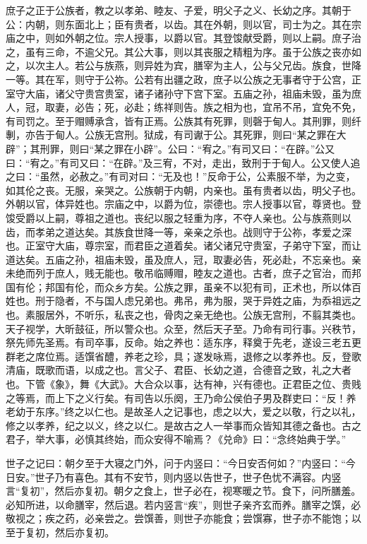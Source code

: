 \documentclass[]{article}
\begin{document}
庶子之正于公族者，教之以孝弟、睦友、子爱，明父子之义、长幼之序。其朝于公：内朝，则东面北上；臣有贵者，以齿。其在外朝，则以官，司士为之。其在宗庙之中，则如外朝之位。宗人授事，以爵以官。其登馂献受爵，则以上嗣。庶子治之，虽有三命，不逾父兄。其公大事，则以其丧服之精粗为序。虽于公族之丧亦如之，以次主人。若公与族燕，则异姓为宾，膳宰为主人，公与父兄齿。族食，世降一等。其在军，则守于公祢。公若有出疆之政，庶子以公族之无事者守于公宫，正室守大庙，诸父守贵宫贵室，诸子诸孙守下宫下室。五庙之孙，祖庙未毁，虽为庶人，冠，取妻，必告；死，必赴；练祥则告。族之相为也，宜吊不吊，宜免不免，有司罚之。至于赗赙承含，皆有正焉。公族其有死罪，则磬于甸人。其刑罪，则纤剸，亦告于甸人。公族无宫刑。狱成，有司谳于公。其死罪，则曰``某之罪在大辟''；其刑罪，则曰``某之罪在小辟''。公曰：``宥之。''有司又曰：``在辟。''公又曰：``宥之。''有司又曰：``在辟。''及三宥，不对，走出，致刑于于甸人。公又使人追之曰：``虽然，必赦之。''有司对曰：``无及也！''反命于公，公素服不举，为之变，如其伦之丧。无服，亲哭之。公族朝于内朝，内亲也。虽有贵者以齿，明父子也。外朝以官，体异姓也。宗庙之中，以爵为位，崇德也。宗人授事以官，尊贤也。登馂受爵以上嗣，尊祖之道也。丧纪以服之轻重为序，不夺人亲也。公与族燕则以齿，而孝弟之道达矣。其族食世降一等，亲亲之杀也。战则守于公祢，孝爱之深也。正室守大庙，尊宗室，而君臣之道着矣。诸父诸兄守贵室，子弟守下室，而让道达矣。五庙之孙，祖庙未毁，虽及庶人，冠，取妻必告，死必赴，不忘亲也。亲未绝而列于庶人，贱无能也。敬吊临赙赗，睦友之道也。古者，庶子之官治，而邦国有伦；邦国有伦，而众乡方矣。公族之罪，虽亲不以犯有司，正术也，所以体百姓也。刑于隐者，不与国人虑兄弟也。弗吊，弗为服，哭于异姓之庙，为忝祖远之也。素服居外，不听乐，私丧之也，骨肉之亲无绝也。公族无宫刑，不翦其类也。天子视学，大昕鼓征，所以警众也。众至，然后天子至。乃命有司行事。兴秩节，祭先师先圣焉。有司卒事，反命。始之养也：适东序，释奠于先老，遂设三老五更群老之席位焉。适馔省醴，养老之珍，具；遂发咏焉，退修之以孝养也。反，登歌清庙，既歌而语，以成之也。言父子、君臣、长幼之道，合德音之致，礼之大者也。下管《象》，舞《大武》。大合众以事，达有神，兴有德也。正君臣之位、贵贱之等焉，而上下之义行矣。有司告以乐阕，王乃命公侯伯子男及群吏曰：``反！养老幼于东序。''终之以仁也。是故圣人之记事也，虑之以大，爱之以敬，行之以礼，修之以孝养，纪之以义，终之以仁。是故古之人一举事而众皆知其德之备也。古之君子，举大事，必慎其终始，而众安得不喻焉？《兑命》曰：``念终始典于学。''

世子之记曰：朝夕至于大寝之门外，问于内竖曰：``今日安否何如？''内竖曰：``今日安。''世子乃有喜色。其有不安节，则内竖以告世子，世子色忧不满容。内竖言``复初''，然后亦复初。朝夕之食上，世子必在，视寒暖之节。食下，问所膳羞。必知所进，以命膳宰，然后退。若内竖言``疾''，则世子亲齐玄而养。膳宰之馔，必敬视之；疾之药，必亲尝之。尝馔善，则世子亦能食；尝馔寡，世子亦不能饱；以至于复初，然后亦复初。
\end{document}
